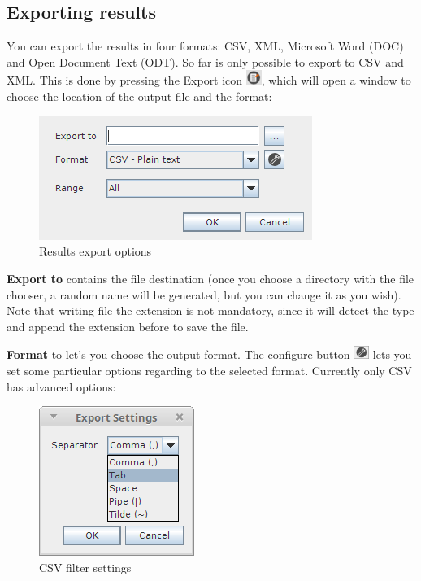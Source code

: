\documentclass[a4paper]{article}
\begin{document}
	\subsection{Exporting results}
	You can export the results in four formats: CSV, XML, Microsoft Word (DOC) and Open Document Text (ODT). So far is only possible to export to CSV and XML. This is done by pressing the Export icon \includegraphics[width=0.5cm]{img/icon_export.png}, which will open a window to choose the location of the output file and the format:
	\begin{figure}[h!]
		\centering
		\includegraphics[width=0.5\linewidth]{img/query_result_exportmenu.png}
		\caption{Results export options}
		\label{fig:query_result_exportmenu}
	\end{figure}
	
	\textbf{Export to} contains the file destination (once you choose a directory with the file chooser, a random name will be generated, but you can change it as you wish). Note that writing file the extension is not mandatory, since it will detect the type and append the extension before to save the file.  
	
	\textbf{Format} to let's you choose the output format. The configure button \includegraphics[width=0.5cm]{img/icon_edit_saved_query.png} lets you set some particular options regarding to the selected format. Currently only CSV has advanced options:		
	\begin{figure}[h!]
		\centering
		\includegraphics[width=0.3\linewidth]{img/query_exports_settings.png}
		\caption{CSV filter settings}
		\label{fig:query_exports_settings}
	\end{figure}
	
\end{document}
